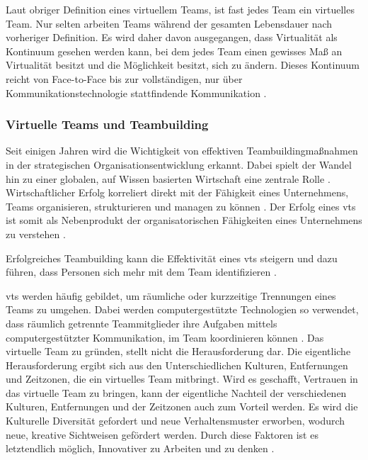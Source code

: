 \documentclass[a4paper,11pt]{article}%
\renewcommand{\\}{\vspace*{0.5\baselineskip} \newline}
\begin{document}
Laut obriger Definition eines virtuellem Teams, ist fast jedes Team ein virtuelles Team. Nur selten arbeiten Teams während der gesamten Lebensdauer nach vorheriger Definition. Es wird daher davon ausgegangen, dass Virtualität als Kontinuum gesehen werden kann, bei dem jedes Team einen gewisses Maß an Virtualität besitzt und die Möglichkeit besitzt, sich zu ändern. Dieses Kontinuum reicht von Face-to-Face bis zur vollständigen, nur über Kommunikationstechnologie stattfindende Kommunikation \cite{martins2004virtual}.
\subsubsection{Virtuelle Teams und Teambuilding}

Seit einigen Jahren wird die Wichtigkeit von effektiven Teambuildingmaßnahmen in der strategischen Organisationsentwicklung erkannt. Dabei spielt der Wandel hin zu einer globalen, auf Wissen basierten Wirtschaft eine zentrale Rolle \citep{belbin2011management} \citep[p.7]{katzenbach2015wisdom}.
Wirtschaftlicher Erfolg korreliert direkt mit der Fähigkeit eines Unternehmens, Teams organisieren, strukturieren und managen zu können \citep{pasmore1993designing}.
Der Erfolg eines \ac{vts} ist somit als Nebenprodukt der organisatorischen Fähigkeiten eines Unternehmens zu verstehen \citep[p.5]{kling1994social}.

Erfolgreiches Teambuilding kann die Effektivität eines \ac{vts} steigern und dazu führen, dass Personen sich mehr mit dem Team identifizieren \citep{kaiser2000student}.

\ac{vts} werden häufig gebildet, um räumliche oder kurzzeitige Trennungen eines Teams zu umgehen. Dabei werden computergestützte Technologien so verwendet, dass räumlich getrennte Teammitglieder ihre Aufgaben mittels computergestützter Kommunikation, im Team koordinieren können \citep[p. 117-119]{peters2007identifying} \citep[p. 1-2]{cascio2003leadership}.
Das virtuelle Team zu gründen, stellt nicht die Herausforderung dar. Die eigentliche Herausforderung ergibt sich aus den Unterschiedlichen Kulturen, Entfernungen und Zeitzonen, die ein virtuelles Team mitbringt. Wird es geschafft, Vertrauen in das virtuelle Team zu bringen, kann der eigentliche Nachteil der verschiedenen Kulturen, Entfernungen und der Zeitzonen auch zum Vorteil werden. Es wird die Kulturelle Diversität gefordert und neue Verhaltensmuster erworben, wodurch neue, kreative Sichtweisen gefördert werden. Durch diese Faktoren ist es letztendlich möglich, Innovativer zu Arbeiten und zu denken \citep{dyer1995team} \citep[p.405-416]{milliken1996searching}.
\end{document}
